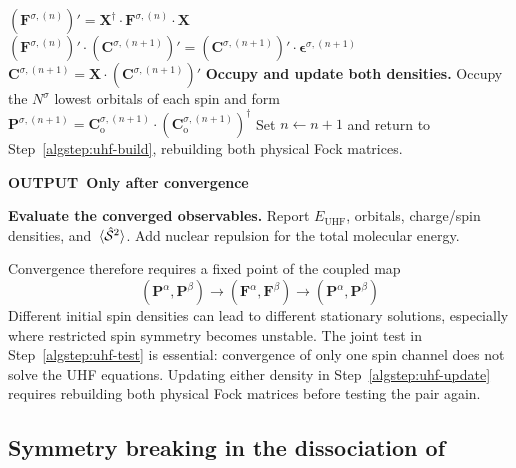\documentclass[11pt,a4paper,titlepage]{article}
\numberwithin{equation}{section}
\newcommand{\bC}{\boldsymbol{C}}
\newcommand{\bF}{\boldsymbol{F}}
\newcommand{\bP}{\boldsymbol{P}}
\newcommand{\bX}{\boldsymbol{X}}
\newcommand{\beps}{\boldsymbol{\epsilon}}
\newcommand{\chS}{\Hat{\mathcal{S}}}
\begin{document}
\begin{hfscfsummary}[title={Algorithm~\thetcbcounter\enspace\textbar\ The UHF self-consistent-field procedure},phantom={\label{alg:uhf-scf-summary}}]
\begin{algorithmic}[1]
  \Statex $\displaystyle
    (\bF^{\sigma,(n)})'
      =\bX^\dag\cdot\bF^{\sigma,(n)}\cdot\bX$
  \Statex $\displaystyle
    (\bF^{\sigma,(n)})'\cdot(\bC^{\sigma,(n+1)})'
      =(\bC^{\sigma,(n+1)})'\cdot\beps^{\sigma,(n+1)}$
  \Statex $\displaystyle
    \bC^{\sigma,(n+1)}=\bX\cdot(\bC^{\sigma,(n+1)})'$
  \State \textbf{Occupy and update both densities.}\label{algstep:uhf-update}
    Occupy the $N^\sigma$ lowest orbitals of each spin and form
  \Statex $\displaystyle
    \bP^{\sigma,(n+1)}=\bC_\text{o}^{\sigma,(n+1)}\cdot
      (\bC_\text{o}^{\sigma,(n+1)})^\dag$
  \Statex Set $n\leftarrow n+1$ and return to
    Step~\ref{algstep:uhf-build}, rebuilding both physical Fock matrices.
  \Statex \smallskip
    \colorbox{hfGreenLight}{\strut\textcolor{hfGreenDark}{\bfseries
      OUTPUT\enspace\textbar\ Only after convergence}}
  \State \textbf{Evaluate the converged observables.}\label{algstep:uhf-output}
    Report $E_\text{UHF}$, orbitals, charge/spin densities, and
    $\expval*{\chS^2}$. Add nuclear repulsion for the total molecular energy.
\end{algorithmic}
\end{hfscfsummary}

Convergence therefore requires a fixed point of the coupled map
\begin{equation}
  (\bP^\alpha,\bP^\beta)
  \longrightarrow
  (\bF^\alpha,\bF^\beta)
  \longrightarrow
  (\bP^\alpha,\bP^\beta)
\end{equation}
Different initial spin densities can lead to different stationary solutions,
especially where restricted spin symmetry becomes unstable.
The joint test in Step~\ref{algstep:uhf-test} is essential: convergence of
only one spin channel does not solve the UHF equations. Updating either
density in Step~\ref{algstep:uhf-update} requires rebuilding both physical
Fock matrices before testing the pair again.

\subsection{Symmetry breaking in the dissociation of }
\end{document}

